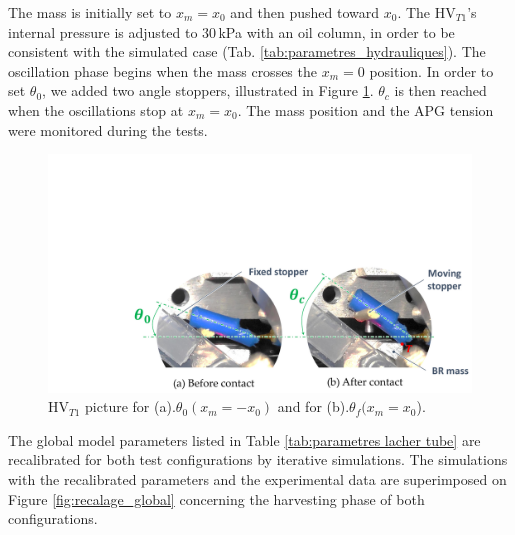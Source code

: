 \documentclass[3p,twocolumn,preprint]{elsarticle}
\begin{document}
The mass is initially set to $x_m=x_0$ and then pushed toward $x_0$. The HV$_{T1}$'s internal pressure is adjusted to $30$\,kPa with an oil column, in order to be consistent with the simulated case (Tab. \ref{tab:parametres_hydrauliques}). The oscillation phase begins when the mass crosses the $x_m=0$ position. In order to set $\theta_0$, we added two angle stoppers, illustrated in Figure \ref{fig:contact_M_VH_lachers}. $\theta_c$ is then reached when the oscillations stop at $x_m=x_0$. The mass position and the APG tension were monitored during the tests.
\begin{figure}[!htbp]
	\begin{center}
		\captionsetup{justification=centering}
		\includegraphics[trim={6.9cm 0cm 0cm 9cm},clip,width=0.9\linewidth]{figures/contact_M_VH_lachers.pdf}
		\caption{HV$_{T1}$ picture for (a).$\theta_0(x_m=-x_{0})$ and for (b).$\theta_f(x_m=x_0$).}
		\label{fig:contact_M_VH_lachers}
	\end{center}
\end{figure}

The global model parameters listed in Table \ref{tab:parametres lacher tube} are recalibrated for both test configurations by iterative simulations. The simulations with the recalibrated parameters and the experimental data are superimposed on Figure \ref{fig:recalage_global} concerning the harvesting phase of both configurations. 
\end{document}
